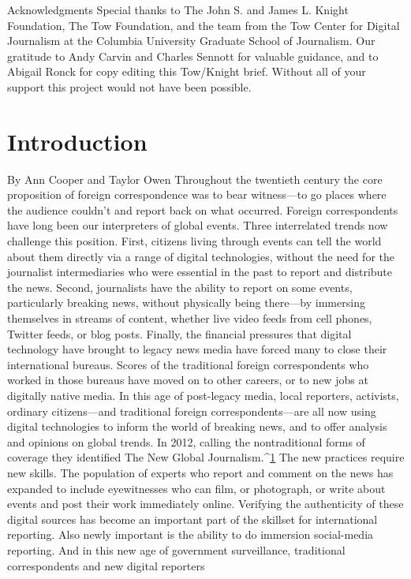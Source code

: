 Acknowledgments
Special thanks to The John S. and James L. Knight Foundation, The Tow Foundation,
and the team from the Tow Center for Digital Journalism at the Columbia University
Graduate School of Journalism. Our gratitude to Andy Carvin and Charles Sennott for
valuable guidance, and to Abigail Ronck for copy editing this Tow/Knight brief. Without
all of your support this project would not have been possible.
\chapter{Introduction}
By Ann Cooper and Taylor Owen
Throughout the twentieth century the core proposition of foreign correspondence was to
bear witness—to go places where the audience couldn’t and report back on what
occurred. Foreign correspondents have long been our interpreters of global events.
Three interrelated trends now challenge this position. First, citizens living through events
can tell the world about them directly via a range of digital technologies, without the need
for the journalist intermediaries who were essential in the past to report and distribute the
news. Second, journalists have the ability to report on some events, particularly breaking
news, without physically being there—by immersing themselves in streams of content,
whether live video feeds from cell phones, Twitter feeds, or blog posts. Finally, the
financial pressures that digital technology have brought to legacy news media have
forced many to close their international bureaus. Scores of the traditional foreign
correspondents who worked in those bureaus have moved on to other careers, or to new
jobs at digitally native media.
In this age of post-legacy media, local reporters, activists, ordinary citizens—and
traditional foreign correspondents—are all now using digital technologies to inform the
world of breaking news, and to offer analysis and opinions on global trends. In 2012,
calling the nontraditional forms of coverage they identified The New Global Journalism.^{\href{#endnotes}{1}}
The new practices require new skills. The population of experts who report and comment
on the news has expanded to include eyewitnesses who can film, or photograph, or write
about events and post their work immediately online. Verifying the authenticity of these
digital sources has become an important part of the skillset for international reporting.
Also newly important is the ability to do immersion social-media reporting. And in this
new age of government surveillance, traditional correspondents and new digital reporters

